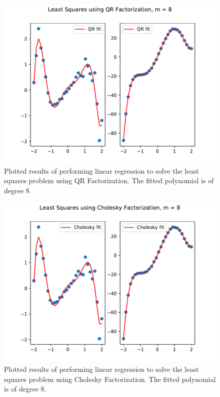 \documentclass[12pt]{article}
\begin{document}
\begin{figure}[h]

	\includegraphics[width = \textwidth]{figures/QR_8.pdf}
	\caption{Plotted results of performing linear regression to solve the least squares
		problem using QR Factorization. The fitted polynomial is of degree 8.}
	\label{fig:qr-8}
\end{figure}
\begin{figure}[h]

	\includegraphics[width = \textwidth]{figures/Cholesky_8.pdf}
	\caption{Plotted results of performing linear regression to solve the least squares
		problem using Cholesky Factorization. The fitted polynomial is of degree 8.}
	\label{fig:cholesky-8}
\end{figure}
\end{document}
